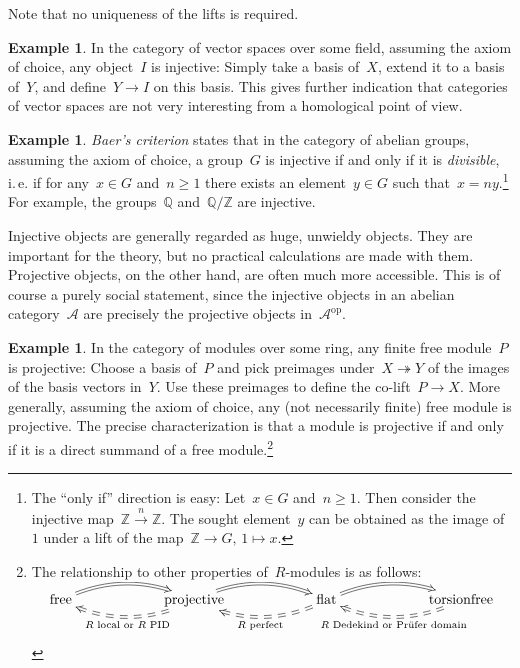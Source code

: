 \documentclass{amsart}
\makeatletter
\theoremstyle{definition}
\newtheorem{ex}[defn]{Example}
\theoremstyle{plain}
\theoremstyle{remark}
\newcommand{\ZZ}{\mathbb{Z}}
\newcommand{\A}{\mathcal{A}}
\newcommand{\QQ}{\mathbb{Q}}
\newcommand{\op}{\mathrm{op}}
\newcommand{\?}{\,{:}\,}
\renewcommand{\_}{\mathpunct{.}\,}
\newcommand{\ie}{i.\,e.\@\xspace}
\makeatother
\begin{document}
Note that no uniqueness of the lifts is required.

\begin{ex}In the category of vector spaces over some field, assuming the axiom
of choice, any object~$I$ is injective: Simply take a basis of~$X$, extend it to a
basis of~$Y$, and define~$Y \to I$ on this basis. This gives
further indication that categories of vector spaces are not very interesting
from a homological point of view.\end{ex}

\begin{ex}\emph{Baer's criterion} states that in the category of abelian
groups, assuming the axiom of choice, a group~$G$ is injective if and only if
it is \emph{divisible}, \ie if for any~$x \in G$ and~$n \geq 1$ there exists an
element~$y \in G$ such that~$x = ny$.\footnote{The ``only if'' direction is
easy: Let~$x \in G$ and~$n \geq 1$. Then consider the injective map~$\ZZ
\xrightarrow{n} \ZZ$. The sought element~$y$ can be obtained as the image
of~$1$ under a lift of the map~$\ZZ \to G,\,1 \mapsto x$.} For example, the
groups~$\QQ$ and~$\QQ/\ZZ$ are injective.
\end{ex}

Injective objects are generally regarded as huge, unwieldy objects. They are
important for the theory, but no practical calculations are made with them.
Projective objects, on the other hand, are often much more accessible. This is
of course a purely social statement, since the injective objects in an abelian
category~$\A$ are precisely the projective objects in~$\A^\op$.

\begin{ex}In the category of modules over some ring, any finite free module~$P$ is
projective: Choose a basis of~$P$ and pick preimages under~$X
\twoheadrightarrow Y$ of the images of the basis vectors in~$Y$. Use these
preimages to define the co-lift~$P \to X$. More generally, assuming the axiom
of choice, any (not necessarily finite) free module is projective. The precise
characterization is that a module is projective if and only if it is a direct
summand of a free module.\footnote{The relationship to other properties
of~$R$-modules is as follows: \\
\[ \xymatrixcolsep{5pc}\xymatrix{
  \text{free} \ar@/^1pc/@{=>}[r] &
  \text{projective} \ar@/^1pc/@{=>}[r] \ar@/^1pc/@{==>}[l]^{\text{$R$ local
  or $R$ PID}} &
  \text{flat} \ar@/^1pc/@{=>}[r] \ar@/^1pc/@{==>}[l]^{\text{$R$ perfect}} &
  \text{torsionfree} \ar@/^1pc/@{==>}[l]^{\text{$R$ Dedekind or Prüfer domain}}
} \]\vspace{-1.6em}}\end{ex}
\end{document}
